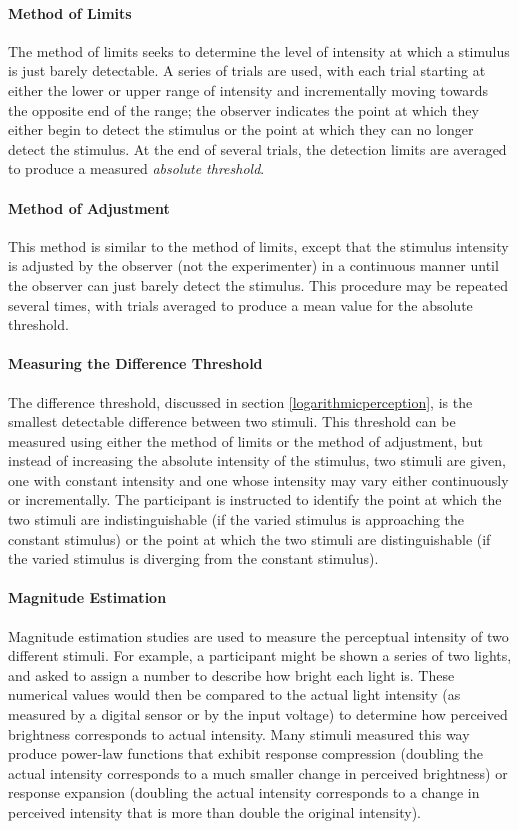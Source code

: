 \documentclass[11pt]{isuthesis}\usepackage[]{graphicx}\usepackage[]{color}
\begin{document}
\paragraph{Method of Limits} The method of limits seeks to determine the level of intensity at which a stimulus is just barely detectable. A series of trials are used, with each trial starting at either the lower or upper range of intensity and incrementally moving towards the opposite end of the range; the observer indicates the point at which they either begin to detect the stimulus or the point at which they can no longer detect the stimulus. At the end of several trials, the detection limits are averaged to produce a measured \emph{absolute threshold}. 

\paragraph{Method of Adjustment} This method is similar to the method of limits, except that the stimulus intensity is adjusted by the observer (not the experimenter) in a continuous manner until the observer can just barely detect the stimulus. This procedure may be repeated several times, with trials averaged to produce a mean value for the absolute threshold. 

\paragraph{Measuring the Difference Threshold} The difference threshold, discussed in section \ref{logarithmicperception}, is the smallest detectable difference between two stimuli. This threshold can be measured using either the method of limits or the method of adjustment, but instead of increasing the absolute intensity of the stimulus, two stimuli are given, one with constant intensity and one whose intensity may vary either continuously or incrementally. The participant is instructed to identify the point at which the two stimuli are indistinguishable (if the varied stimulus is approaching the constant stimulus) or the point at which the two stimuli are distinguishable (if the varied stimulus is diverging from the constant stimulus). 

\paragraph{Magnitude Estimation} Magnitude estimation studies are used to measure the perceptual intensity of two different stimuli. For example, a participant might be shown a series of two lights, and asked to assign a number to describe how bright each light is. These numerical values would then be compared to the actual light intensity (as measured by a digital sensor or by the input voltage) to determine how perceived brightness corresponds to actual intensity. Many stimuli measured this way produce power-law functions that exhibit response compression (doubling the actual intensity corresponds to a much smaller change in perceived brightness) or response expansion (doubling the actual intensity corresponds to a change in perceived intensity that is more than double the original intensity). 
\end{document}
